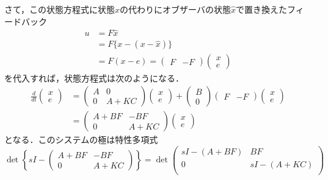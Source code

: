さて，この状態方程式に状態$x$の代わりにオブザーバの状態$\hat{x}$で置き換えたフィードバック
\begin{align}
 u &= F \hat{x}
\nonumber \\
   &= F \{x - (x-\hat{x})\}
\nonumber \\
   &= F (x - e) 
    = \left( \begin{array}{cc} F & -F \end{array} \right)
      \left( \begin{array}{c}
               x \\
               e 
             \end{array} \right)
\end{align}
を代入すれば，状態方程式は次のようになる．
\begin{align}
 \frac{d}{dt}
  \left(\begin{array}{c}
         x \\
	 e
	\end{array}\right)
  &=
  \left(\begin{array}{cc}
         A & 0 \\
	 0 & A+KC
	\end{array}\right)
  \left(\begin{array}{c}
         x \\
	 e
	\end{array}\right)
  +
  \left(\begin{array}{c}
         B \\
	 0
	\end{array}\right)
  \left( \begin{array}{cc} F & -F \end{array} \right)
  \left( \begin{array}{c}
               x \\
               e 
         \end{array} \right)
\nonumber \\
 &=
 \left(\begin{array}{cc}
        A + BF & -BF \\
	0 & A + KC
       \end{array}\right)
 \left(\begin{array}{c}
         x \\
	 e
       \end{array}\right)
\end{align}
となる．このシステムの極は特性多項式
\begin{equation}
 \det\left\{s I - \left(\begin{array}{cc}
		         A + BF & -BF \\
			 0 & A + KC
			\end{array}\right)\right\}
 =
 \det\left(\begin{array}{cc}
            sI - (A + BF) & BF \\
	    0 & sI - (A + KC) \\
	   \end{array}\right)
\end{equation}
